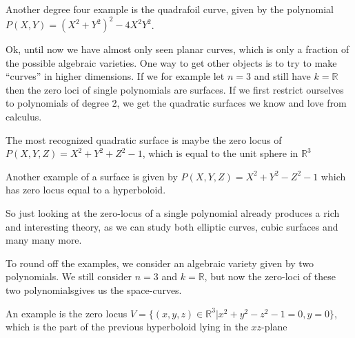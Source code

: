 \begin{example}    
Another degree four example is the quadrafoil curve, given by the polynomial $P(X, Y) = (X^2+Y^2)^2-4X^2Y^2$.
\begin{center}
\def\svgwidth{0.4\textwidth}

\end{center}
\end{example}

Ok, until now we have almost only seen planar curves, which is only a fraction of the possible algebraic varieties. One way to get other objects is to try to make ``curves'' in higher dimensions. If we for example let $n=3$ and still have $k=\mathbb{R}$ then the zero loci of single polynomials are surfaces. If we first restrict ourselves to polynomials of degree 2, we get the quadratic surfaces we know and love from calculus. 

\begin{example}
The most recognized quadratic surface is maybe the zero locus of $P(X, Y, Z) = X^2+Y^2+Z^2-1$, which is equal to the unit sphere in $\mathbb{R}^3$
\begin{center}
\def\svgwidth{0.4\textwidth}

\end{center}
\end{example}

\begin{example}
Another example of a surface is given by $P(X, Y, Z) = X^2+Y^2-Z^2-1$ which has zero locus equal to a hyperboloid.
\begin{center}
\def\svgwidth{0.4\textwidth}

\end{center}
\end{example}

So just looking at the zero-locus of a single polynomial already produces a rich and interesting theory, as we can study both elliptic curves, cubic surfaces and many many more. 

To round off the examples, we consider an algebraic variety given by two polynomials. We still consider $n=3$ and $k=\mathbb{R}$, but now the zero-loci of these two polynomialsgives us the space-curves.

\begin{example}
An example is the zero locus $V=\{(x,y,z)\in \mathbb{R}^3 \vert x^2+y^2-z^2-1 = 0, y=0\}$, which is the part of the previous hyperboloid lying in the $xz$-plane
\end{example}

